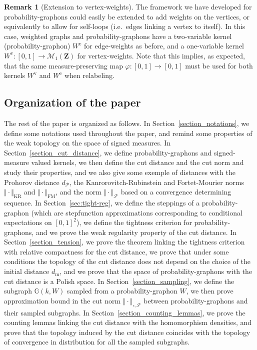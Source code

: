 \documentclass{amsart}
\newcommand{\ie}{i.e.\ }
\theoremstyle{plain}
\theoremstyle{definition}
\newtheorem{remark}[Th]{Remark}
\newcommand{\Space}{\mathbf{Z}}
\newcommand{\bbG}{\mathbb{G}}
\newcommand{\Proba}{\mathcal{M}_1(\Space)}
\newcommand{\m}{\mathrm{m}}
\newcommand{\dmeas}{d_\m}
\newcommand{\NmeasFSymbol}{\Vert\cdot\Vert_{\mathcal{F}}}
\newcommand{\NcutFSymbol}{\Vert\cdot\Vert_{\square,\mathcal{F}}}
\newcommand{\dmeasP}{d_{\mathcal{P}}}
\newcommand{\mKR}{\text{KR}}
\newcommand{\NmeasKRSymbol}{\Vert\cdot\Vert_{\mKR}}
\newcommand{\mFM}{\text{FM}}
\newcommand{\NmeasFMSymbol}{\Vert\cdot\Vert_{\mFM}}
\begin{document}
\begin{remark}[Extension to vertex-weights]
The framework we have developed for probability-graphons could easily be extended to add
	weights on the vertices, or equivalently to allow for self-loops (\ie edges linking a vertex to itself).
In this case, weighted graphs and probability-graphons have 
			a two-variable kernel (probability-graphon) $W^{\text{e}}$ for edge-weights as before,
			and a one-variable kernel $W^{\text{v}} : [0,1] \to \Proba$ for vertex-weights.
Note that this implies, as expected, that the same measure-preserving map $\varphi : [0,1]\to[0,1]$
	must be used for both kernels $W^{\text{v}}$ and $W^{\text{e}}$ when relabeling.
\end{remark}


\subsection{Organization of the paper}

The rest of the paper is organized as follows.
In Section~\ref{section_notations}, we define some notations used throughout the paper,
	and remind some properties of the weak topology on the space of signed measures.
In Section~\ref{section_cut_distance},
	we define probability-graphons and signed-measure valued kernels,
	we then define the cut distance and the cut norm and study their properties,
	and we also give some exemple of distances with the Prohorov distance $\dmeasP$,
		the Kanrorovitch-Rubinstein and Fortet-Mourier norms $\NmeasKRSymbol$ and $\NmeasFMSymbol$,
		and the norm $\NmeasFSymbol$ based on a convergence determining sequence.
In Section~\ref{sec:tight-reg},
	we define the steppings
	of a probability-graphon (which are stepfunction approximations corresponding to conditional expectations on $[0,1]^2$),
	we define the tightness criterion for probability-graphons,
	and we prove the weak regularity property of the cut distance.
In Section~\ref{section_tension},
	we prove the theorem linking the tightness criterion with relative compactness for the cut distance,
	we prove that under some conditions the topology of the cut distance does not
		depend on the choice of the initial distance $\dmeas$,
	and we prove that the space of probability-graphons with the cut distance is a Polish space.
In Section~\ref{section_sampling},
	we define the subgraph $\bbG(k,W)$ sampled from a probability-graphon $W$,
	we then prove approximation bound in the cut norm $\NcutFSymbol$ between probability-graphons
		and their sampled subgraphs.
In Section~\ref{section_counting_lemmas},
	we prove the counting lemmas linking the cut distance
		with the homomorphism densities,
	and prove that the topology induced by the cut distance
	coincides with the topology of convergence in distribution for all the sampled subgraphs.
	
\end{document}
